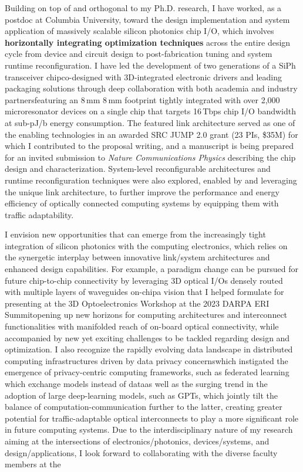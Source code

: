 Building on top of and orthogonal to my Ph.D. research, I have worked, as a postdoc at Columbia University, toward the design implementation and system application of massively scalable silicon photonics chip I/O, which involves \textbf{horizontally integrating optimization techniques} across the entire design cycle from device and circuit design to post-fabrication tuning and system runtime reconfiguration. I have led the development of two generations of a SiPh transceiver chip\textemdash co-designed with 3D-integrated electronic drivers and leading packaging solutions through deep collaboration with both academia and industry partners\textemdash featuring an 8\,mm \texttimes{} 8\,mm footprint tightly integrated with over 2,000 microresonator devices on a single chip that targets 16\,Tbps chip I/O bandwidth at sub-pJ/b energy consumption. The featured link architecture served as one of the enabling technologies in an awarded SRC JUMP 2.0 grant (23 PIs, \$35M) for which I contributed to the proposal writing, and a manuscript is being prepared for an invited submission to \emph{Nature Communications Physics} describing the chip design and characterization. System-level reconfigurable architectures and runtime reconfiguration techniques were also explored, enabled by and leveraging the unique link architecture, to further improve the performance and energy efficiency of optically connected computing systems by equipping them with traffic adaptability.

I envision new opportunities that can emerge from the increasingly tight integration of silicon photonics with the computing electronics, which relies on the synergetic interplay between innovative link/system architectures and enhanced design capabilities. For example, a paradigm change can be pursued for future chip-to-chip connectivity by leveraging 3D optical I/Os densely routed with multiple layers of waveguides on-chip\textemdash a vision that I helped formulate for presenting at the 3D Optoelectronics Workshop at the 2023 DARPA ERI Summit\textemdash opening up new horizons for
computing architectures and interconnect functionalities with manifolded reach of on-board optical connectivity, while accompanied by new yet exciting challenges to be tackled regarding design and optimization. I also recognize the rapidly evolving data landscape in distributed computing infrastructures driven by data privacy concerns\textemdash which instigated the emergence of privacy-centric computing frameworks, such as federated learning which exchange models instead of data\textemdash as well as the surging trend in the adoption of large deep-learning models, such as GPTs, which jointly tilt the balance of computation-communication further to the latter, creating greater potential for traffic-adaptable optical interconnects to play a more significant role in future computing systems. Due to the interdisciplinary nature of my research aiming at the intersections of electronics/photonics, devices/systems, and design/applications, I look forward to collaborating with the diverse faculty members at the \appSchool{}%